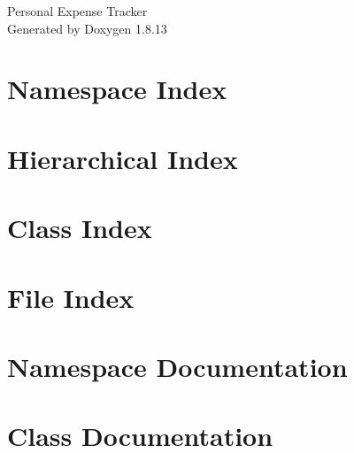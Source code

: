\documentclass[twoside]{article}
\newcommand{\+}{\discretionary{\mbox{\scriptsize$\hookleftarrow$}}{}{}}
\begin{document}
\hypersetup{pageanchor=false,
             bookmarksnumbered=true,
             pdfencoding=unicode
            }
\begin{titlepage}
\vspace*{7cm}
\begin{center}%
{\Large Personal Expense Tracker }\\
\vspace*{1cm}
{\large Generated by Doxygen 1.8.13}\\
\end{center}
\end{titlepage}
\tableofcontents
{}
\hypersetup{pageanchor=true}

\section{Namespace Index}

\section{Hierarchical Index}

\section{Class Index}

\section{File Index}

\section{Namespace Documentation}















\section{Class Documentation}













\end{document}
